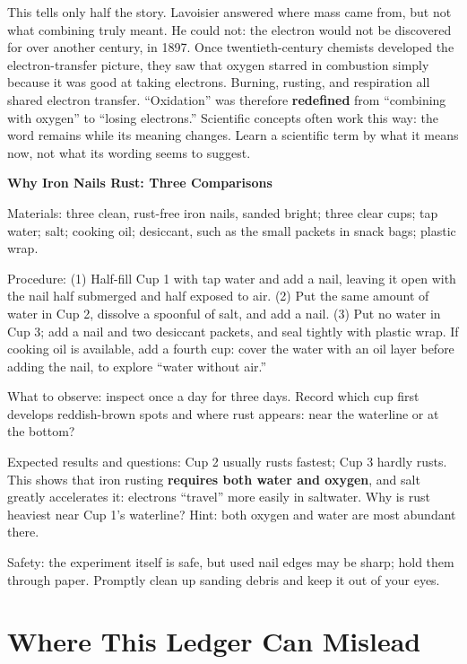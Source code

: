 \begin{zhengju}
This tells only half the story. Lavoisier answered where mass came from, but not what combining truly meant. He could not: the electron would not be discovered for over another century, in 1897. Once twentieth-century chemists developed the electron-transfer picture, they saw that oxygen starred in combustion simply because it was good at taking electrons. Burning, rusting, and respiration all shared electron transfer. ``Oxidation'' was therefore \textbf{redefined} from ``combining with oxygen'' to ``losing electrons.'' Scientific concepts often work this way: the word remains while its meaning changes. Learn a scientific term by what it means now, not what its wording seems to suggest.
\end{zhengju}

\begin{shiyan}
\textbf{Why Iron Nails Rust: Three Comparisons}

Materials: three clean, rust-free iron nails, sanded bright; three clear cups; tap water; salt; cooking oil; desiccant, such as the small packets in snack bags; plastic wrap.

Procedure: (1) Half-fill Cup 1 with tap water and add a nail, leaving it open with the nail half submerged and half exposed to air. (2) Put the same amount of water in Cup 2, dissolve a spoonful of salt, and add a nail. (3) Put no water in Cup 3; add a nail and two desiccant packets, and seal tightly with plastic wrap. If cooking oil is available, add a fourth cup: cover the water with an oil layer before adding the nail, to explore ``water without air.''

What to observe: inspect once a day for three days. Record which cup first develops reddish-brown spots and where rust appears: near the waterline or at the bottom?

Expected results and questions: Cup 2 usually rusts fastest; Cup 3 hardly rusts. This shows that iron rusting \textbf{requires both water and oxygen}, and salt greatly accelerates it: electrons ``travel'' more easily in saltwater. Why is rust heaviest near Cup 1's waterline? Hint: both oxygen and water are most abundant there.

Safety: the experiment itself is safe, but used nail edges may be sharp; hold them through paper. Promptly clean up sanding debris and keep it out of your eyes.
\end{shiyan}

\section{Where This Ledger Can Mislead}


